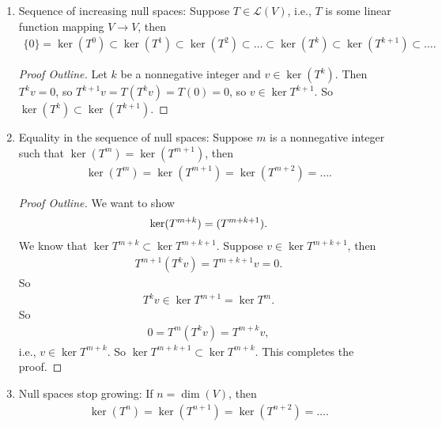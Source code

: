 \documentclass{book}
\theoremstyle{definition}
\newcommand{\lag}{\mathcal{L}}
\begin{document}
\begin{enumerate}
	\item Sequence of increasing null spaces: Suppose $T \in \lag(V)$, i.e., $T$ is some linear function mapping $V\to V$, then
	\begin{align*}
	\{ 0 \} = \ker(T^0) \subset \ker(T^1) \subset \ker(T^2) \subset \dots \subset \ker(T^k) \subset \ker(T^{k+1}) \subset\dots.
	\end{align*} 
	
	\begin{proof}[Proof Outline]
		Let $k$ be a nonnegative integer and $v\in \ker(T^k)$. Then $T^kv = 0$, so $T^{k+1}v = T(T^kv) = T(0) = 0$, so $v\in \ker T^{k+1}$. So $\ker(T^k) \subset \ker(T^{k+1})$. 
	\end{proof}
	\item Equality in the sequence of null spaces: Suppose $m$ is a nonnegative integer such that $\ker(T^m) = \ker(T^{m+1})$, then
	\begin{align*}
	\ker(T^m) = \ker(T^{m+1}) = \ker(T^{m+2}) = \dots.
	\end{align*}
	
	\begin{proof}[Proof Outline]
		We want to show
		\begin{align*}
		\ker(T^{m+k}) = \null(T^{m+k+1}).
		\end{align*}
		We know that $\ker T^{m+k} \subset \ker T^{m+k+1}$. Suppose $v\in \ker T^{m+k+1}$, then
		\begin{align*}
		T^{m+1}(T^kv) = T^{m+k+1}v = 0.
		\end{align*}
		So
		\begin{align*}
		T^kv \in \ker T^{m+1} = \ker T^m.
		\end{align*}
		So
		\begin{align*}
		0 = T^m(T^kv) = T^{m+k}v,
		\end{align*}
		i.e., $v\in \ker T^{m+k}$. So $\ker T^{m+k+1} \subset \ker T^{m+k}$. This completes the proof. 
	\end{proof}
	\item Null spaces stop growing: If $n = \dim(V)$, then
	\begin{align*}
	\ker(T^n) = \ker(T^{n+1}) = \ker(T^{n+2}) = \dots.
	\end{align*}
	

\end{enumerate}
\end{document}
